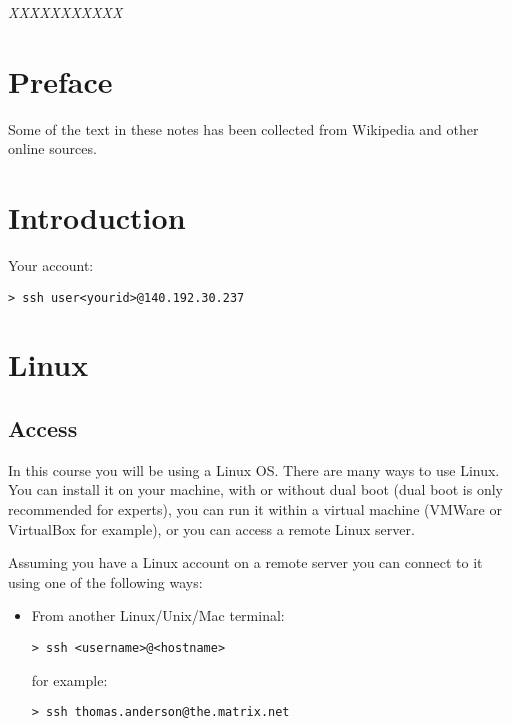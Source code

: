 \documentclass[justified,sixbynine]{tufte-book}
\theoremstyle{plain}%
\theoremstyle{definition}
\theoremstyle{remark}
\begin{document}
\newpage
\nohyphenation
\thispagestyle{empty}
\phantom{placeholder}
\vspace{2in}
\hskip 3in
{\it XXXXXXXXXXX }
\newpage
\thispagestyle{empty}
\phantom {a}
\newpage

\setlength{\cftparskip}{\baselineskip}
\tableofcontents

\mainmatter
\begin{fullwidth}

\chapter*{Preface}

Some of the text in these notes has been collected from Wikipedia and other online sources.

\goodbreak\chapter{Introduction}

Your account:

\begin{lstlisting}
> ssh user<yourid>@140.192.30.237
\end{lstlisting}

\goodbreak\chapter{Linux}

\section{Access}

In this course you will be using a Linux OS. There are many ways to use Linux. You can install it on your machine, with or without dual boot (dual boot is only recommended for experts), you can run it within a virtual machine (VMWare or VirtualBox for example), or you can access a remote Linux server.

Assuming you have a Linux account on a remote server you can connect to it using one of the following ways:

\begin{itemize}

\item
From another Linux/Unix/Mac terminal:
\begin{lstlisting}
> ssh <username>@<hostname>
\end{lstlisting}
for example:
\begin{lstlisting}
> ssh thomas.anderson@the.matrix.net
\end{lstlisting}


\end{itemize}
\end{fullwidth}
\end{document}
